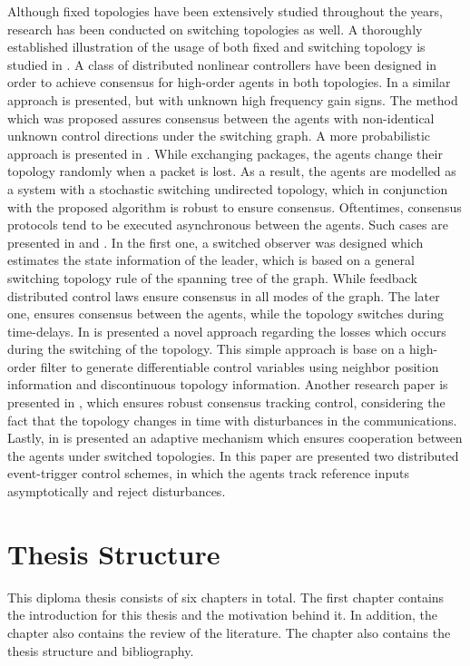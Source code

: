     Although fixed topologies have been extensively studied throughout the years, research has been conducted on switching topologies as well. A thoroughly established illustration of the usage of both fixed and switching topology is studied in \cite{8723151}. A class of distributed nonlinear controllers have been designed in order to achieve consensus for high-order agents in both topologies. In \cite{8445642} a similar approach is presented, but with unknown high frequency gain signs. The method which was proposed assures consensus between the agents with non-identical unknown control directions under the switching graph. A more probabilistic approach is presented in \cite{5404835}. While exchanging packages, the agents change their topology randomly when a packet is lost. As a result, the agents are modelled as a system with a stochastic switching undirected topology, which in conjunction with the proposed algorithm is robust to ensure consensus. Oftentimes, consensus protocols tend to be executed asynchronous between the agents. Such cases are presented in \cite{9244621} and \cite{4631522}. In the first one, a switched observer was designed which estimates the state information of the leader, which is based on a general switching topology rule of the spanning tree of the graph. While feedback distributed control laws ensure consensus in all modes of the graph. The later one, ensures consensus between the agents, while the topology switches during time-delays. In \cite{9736623} is presented a novel approach regarding the losses which occurs during the switching of the topology. This simple approach is base on a high-order filter to generate differentiable control variables using neighbor position information  and discontinuous topology information. Another research paper is presented in \cite{6839031}, which ensures robust consensus tracking control, considering the fact that the topology changes in time with disturbances in the communications. Lastly, in \cite{8100757} is presented an adaptive mechanism which ensures cooperation between the agents under switched topologies. In this paper are presented two distributed event-trigger control schemes, in which the agents track reference inputs asymptotically and reject disturbances. 

\section{Thesis Structure}

This diploma thesis consists of six chapters in total. The first chapter contains the introduction for this thesis and the motivation behind it. In addition, the chapter also contains the review of the literature. The chapter also contains the thesis structure and bibliography.

